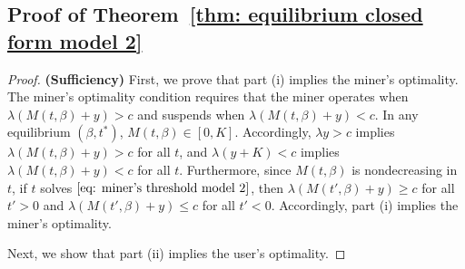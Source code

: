 \documentclass[12pt, letterpaper]{article}
\begin{document}
\subsection{Proof of Theorem~\ref{thm: equilibrium closed form model 2}}\label{subsec: equilibrium closed form model 2}

\begin{proof} %



\textbf{(Sufficiency)} First, we prove that part (i) implies the miner's optimality. The miner's optimality condition requires that the miner operates when $\lambda(M(t, \beta) + y) > c$ and suspends when $\lambda(M(t, \beta) + y) < c$. In any equilibrium $(\beta, t^*)$, $M(t, \beta) \in [0, K]$. Accordingly, $\lambda y > c$ implies $\lambda(M(t, \beta) + y) > c$ for all $t$, and $\lambda (y + K) < c$ implies $\lambda(M(t, \beta) + y) < c$ for all $t$. Furthermore, since $M(t, \beta)$ is nondecreasing in $t$, if $t$ solves $\eqref{eq: miner's threshold model 2}$, then $\lambda(M(t', \beta) + y) \ge c$ for all $t' > 0$ and $\lambda(M(t', \beta) + y) \le c$ for all $t' < 0$. Accordingly, part (i) implies the miner's optimality.


Next, we show that part (ii) implies the user's optimality.


\end{proof}
\end{document}
